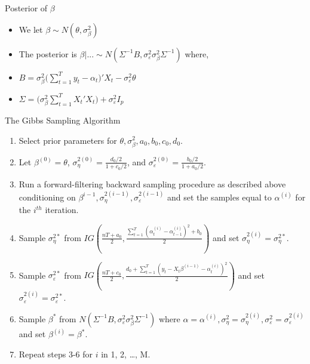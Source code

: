 \documentclass[
  ignorenonframetext,
]{beamer}
\providecommand{\tightlist}{%
  \setlength{\itemsep}{0pt}\setlength{\parskip}{0pt}}
\begin{document}
\begin{frame}{Posterior of \(\beta\)}
\protect\hypertarget{posterior-of-beta}{}
\begin{itemize}
\tightlist
\item
  We let \(\beta \sim N(\theta, \sigma^2_\beta)\)
\item
  The posterior is
  \(\beta|... \sim N(\Sigma^{-1}B, \sigma^2_\varepsilon\sigma^2_\beta\Sigma^{-1})\)
  where,
\item
  \(B = \sigma^2_\beta\big(\sum^T_{t=1}y_t-\alpha_t\big)'X_t -\sigma^2_\varepsilon\theta\)
\item
  \(\Sigma = \big(\sigma^2_\beta\sum^T_{t=1}X_t'X_t\big)+\sigma^2_\varepsilon I_p\)
\end{itemize}
\end{frame}

\begin{frame}{The Gibbs Sampling Algorithm}
\protect\hypertarget{the-gibbs-sampling-algorithm}{}
\begin{enumerate}
\tightlist
\item
  Select prior parameters for
  \(\theta, \sigma^2_\beta, a_0, b_0, c_0, d_0\).
\item
  Let \(\beta^{(0)} = \theta\),
  \(\sigma^{2(0)}_\eta = \frac{d_0/2}{1+c_0/2}\), and
  \(\sigma^{2(0)}_\varepsilon = \frac{b_0/2}{1+a_0/2}\).
\item
  Run a forward-filtering backward sampling procedure as described above
  conditioning on
  \(\beta^{i-1}, \sigma^{2(i-1)}_\eta, \sigma^{2(i-1)}_\varepsilon\) and
  set the samples equal to \(\alpha^{(i)}\) for the \(i^{th}\)
  iteration.
\item
  Sample \(\sigma^{2*}_\eta\) from
  \(IG(\frac{nT+a_0}{2}, \frac{\sum^T_{t=1} (\alpha^{(i)}_t-\alpha^{(i)}_{t-1})^2+b_0}{2})\)
  and set \(\sigma^{2(i)}_\eta = \sigma^{2*}_\eta\).
\item
  Sample \(\sigma^{2*}_\varepsilon\) from
  \(IG(\frac{nT+c_0}{2}, \frac{d_0 + \sum^T_{t=1}(y_t-X_t\beta^{(i-1)}-\alpha_t^{(i)})^2}{2})\)
  and set \(\sigma^{2(i)}_\varepsilon = \sigma^{2*}_\varepsilon\).
\item
  Sample \(\beta^*\) from
  \(N(\Sigma^{-1}B, \sigma^2_\varepsilon\sigma^2_\beta\Sigma^{-1})\)
  where
  \(\alpha = \alpha^{(i)}, \sigma^{2}_\eta = \sigma^{2(i)}_\eta, \sigma^{2}_\varepsilon=\sigma^{2(i)}_\varepsilon\)
  and set \(\beta^{(i)} = \beta^*\).
\item
  Repeat steps 3-6 for \(i\) in 1, 2, \ldots, M.
\end{enumerate}
\end{frame}
\end{document}
